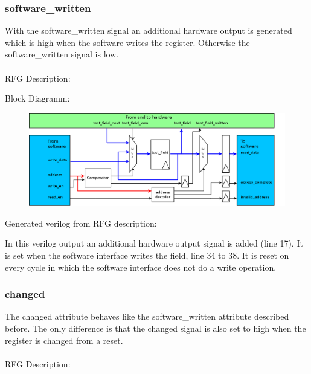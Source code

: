 \documentclass[12pt,a4paper]{article}
\begin{document}
\subsubsection{software\_written}
With the software\_written signal an additional hardware output is generated which is high when the software writes the register. Otherwise the software\_written signal is low.\\
\\
RFG Description:


Block Diagramm:
\begin{figure}[h!]
    \includegraphics[width=\textwidth]{pictures/Reg_hrw_srw_swritten.png}
\end{figure}
\newpage
Generated verilog from RFG description:

In this verilog output an additional hardware output signal is added (line 17). It is set when the software interface writes the field, line 34 to 38. It is reset on every cycle in which the software interface does not do a write operation.
\newpage
\subsubsection{changed}

The changed attribute behaves like the software\_written attribute described before. The only difference is that the changed signal is also set to high when the register is changed from a reset.\\
\\
RFG Description:

\end{document}
